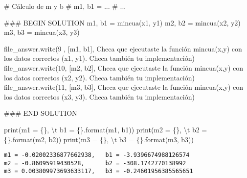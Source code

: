 \documentclass[
  letterpaper,
  DIV=11,
  numbers=noendperiod]{scrreprt}
\newenvironment{Shaded}{\begin{snugshade}}{\end{snugshade}}
\newcommand{\BuiltInTok}[1]{\textcolor[rgb]{0.00,0.23,0.31}{#1}}
\newcommand{\CharTok}[1]{\textcolor[rgb]{0.13,0.47,0.30}{#1}}
\newcommand{\CommentTok}[1]{\textcolor[rgb]{0.37,0.37,0.37}{#1}}
\newcommand{\NormalTok}[1]{\textcolor[rgb]{0.00,0.23,0.31}{#1}}
\newcommand{\OperatorTok}[1]{\textcolor[rgb]{0.37,0.37,0.37}{#1}}
\newcommand{\RegionMarkerTok}[1]{\textcolor[rgb]{0.00,0.23,0.31}{#1}}
\newcommand{\SpecialCharTok}[1]{\textcolor[rgb]{0.37,0.37,0.37}{#1}}
\newcommand{\StringTok}[1]{\textcolor[rgb]{0.13,0.47,0.30}{#1}}
\begin{document}
\begin{Shaded}
\begin{Highlighting}[]
\CommentTok{\# Cálculo de m y b}
\CommentTok{\# m1, b1 = ...}
\CommentTok{\# ...}

\CommentTok{\#\#\# }\RegionMarkerTok{BEGIN}\CommentTok{ SOLUTION}
\NormalTok{m1, b1 }\OperatorTok{=}\NormalTok{ mincua(x1, y1)}
\NormalTok{m2, b2 }\OperatorTok{=}\NormalTok{ mincua(x2, y2)}
\NormalTok{m3, b3 }\OperatorTok{=}\NormalTok{ mincua(x3, y3)}

\NormalTok{file\_answer.write(}\StringTok{\textquotesingle{}9\textquotesingle{}}\NormalTok{ , [m1, b1], }\StringTok{\textquotesingle{}Checa que ejecutaste la función mincua(x,y) con los datos correctos (x1, y1). Checa también tu implementación\textquotesingle{}}\NormalTok{)}
\NormalTok{file\_answer.write(}\StringTok{\textquotesingle{}10\textquotesingle{}}\NormalTok{, [m2, b2], }\StringTok{\textquotesingle{}Checa que ejecutaste la función mincua(x,y) con los datos correctos (x2, y2). Checa también tu implementación\textquotesingle{}}\NormalTok{)}
\NormalTok{file\_answer.write(}\StringTok{\textquotesingle{}11\textquotesingle{}}\NormalTok{, [m3, b3], }\StringTok{\textquotesingle{}Checa que ejecutaste la función mincua(x,y) con los datos correctos (x3, y3). Checa también tu implementación\textquotesingle{}}\NormalTok{)}

\CommentTok{\#\#\# }\RegionMarkerTok{END}\CommentTok{ SOLUTION}

\BuiltInTok{print}\NormalTok{(}\StringTok{\textquotesingle{}m1 = }\SpecialCharTok{\{\}}\StringTok{, }\CharTok{\textbackslash{}t}\StringTok{ b1 = }\SpecialCharTok{\{\}}\StringTok{\textquotesingle{}}\NormalTok{.}\BuiltInTok{format}\NormalTok{(m1, b1))}
\BuiltInTok{print}\NormalTok{(}\StringTok{\textquotesingle{}m2 = }\SpecialCharTok{\{\}}\StringTok{, }\CharTok{\textbackslash{}t}\StringTok{ b2 = }\SpecialCharTok{\{\}}\StringTok{\textquotesingle{}}\NormalTok{.}\BuiltInTok{format}\NormalTok{(m2, b2))}
\BuiltInTok{print}\NormalTok{(}\StringTok{\textquotesingle{}m3 = }\SpecialCharTok{\{\}}\StringTok{, }\CharTok{\textbackslash{}t}\StringTok{ b3 = }\SpecialCharTok{\{\}}\StringTok{\textquotesingle{}}\NormalTok{.}\BuiltInTok{format}\NormalTok{(m3, b3))}
\end{Highlighting}
\end{Shaded}

\begin{verbatim}
m1 = -0.02002336877662938,   b1 = -3.9396674988126574
m2 = -0.86095919430528,      b2 = -308.1742770138992
m3 = 0.003809973693633117,   b3 = -0.24601956385565651
\end{verbatim}
\end{document}
